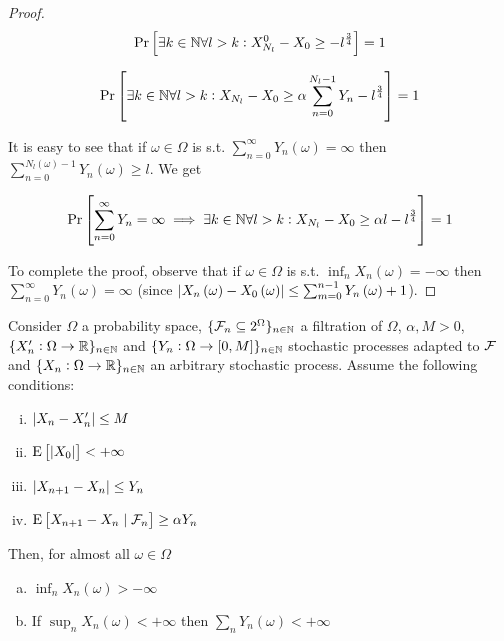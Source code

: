 \begin{proof}
$$\Pr\left[\exists k \in \mathbb{N} \forall l > k: X^0_{N_l} - X_0 \geq -l^{\frac{3}{4}}\right] = 1$$

$$\Pr\left[\exists k \in \mathbb{N} \forall l > k: X_{N_l} - X_0 \geq \alpha \sum_{n=0}^{N_l - 1} Y_n - l^{\frac{3}{4}}\right] = 1$$


It is easy to see that if $\omega \in \Omega$ is s.t. $\sum_{n=0}^\infty Y_n\left(\omega\right) = \infty$ then $\sum_{n=0}^{N_l\left(\omega\right) - 1} Y_n\left(\omega\right) \geq l$. We get

$$\Pr\left[\sum_{n=0}^\infty  Y_n = \infty \implies \exists k \in \mathbb{N} \forall l > k: X_{N_l} - X_0 \geq \alpha l - l^{\frac{3}{4}}\right]=1$$

To complete the proof, observe that if ${\omega \in \Omega}$ is s.t. ${\inf_n X_n\left(\omega\right) = -\infty}$ then ${\sum_{n=0}^\infty  Y_n\left(\omega\right) = \infty}$ (since ${\lvert X_n\left(\omega\right) - X_0\left(\omega\right) \rvert \leq \sum_{m=0}^{n-1} Y_n\left(\omega\right) + 1}$).
\end{proof}

\begin{samepage}
\begin{corollary}
\label{crl:prudent}

Consider $\Omega$ a probability space, $\{\mathcal{F}_n \subseteq 2^\Omega\}_{n \in \mathbb{N}}$ a filtration of $\Omega$, $\alpha,M > 0$, $\{X'_n: \Omega \rightarrow \mathbb{R}\}_{n \in \mathbb{N}}$ and $\{Y_n: \Omega \rightarrow \left[0,M\right]\}_{n \in \mathbb{N}}$ stochastic processes adapted to $\mathcal{F}$ and $\{X_n: \Omega \rightarrow \mathbb{R}\}_{n \in \mathbb{N}}$ an arbitrary stochastic process. Assume the following conditions:

\begin{enumerate}[i.]

\item $\lvert X_n - X'_n \rvert \leq M$
\item $\operatorname{E}\left[\lvert X_0 \rvert\right] < +\infty$
\item $\lvert X_{n+1} - X_n \rvert \leq Y_n$
\item $\operatorname{E}\left[X_{n+1} - X_n \mid \mathcal{F}_n\right] \geq \alpha Y_n$

\end{enumerate}

Then, for almost all $\omega \in \Omega$

\begin{enumerate}[a.]

\item\label{itm:crl_prudent__inf} $\inf_n X_n\left(\omega\right) > -\infty$
\item\label{itm:crl_prudent__sup} If $\sup_n X_n\left(\omega\right) < +\infty$ then $\sum_n Y_n\left(\omega\right) < +\infty$

\end{enumerate}

\end{corollary}
\end{samepage}

